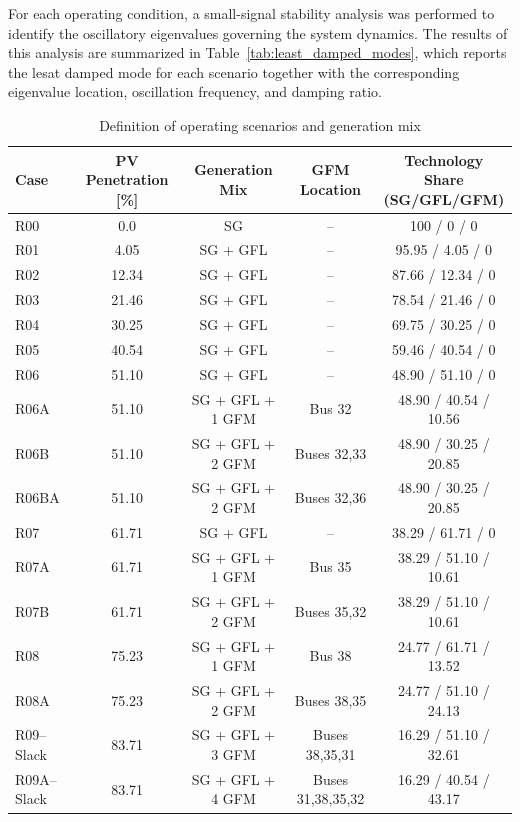 For each operating condition, a small-signal stability analysis was performed to identify the oscillatory eigenvalues governing the system dynamics. The results of this analysis are summarized in Table~\ref{tab:least_damped_modes}, which reports the lesat damped mode for each scenario together with the corresponding eigenvalue location, oscillation frequency, and damping ratio.

\begin{table}[htbp]
\centering
\caption{Definition of operating scenarios and generation mix}
\label{tab:scenario_definition}
\begin{tabular}{lcccc}
\toprule
Case & PV Penetration [\%] & Generation Mix & GFM Location & \makecell{Technology Share \\ (SG/GFL/GFM)}\\
\midrule
R00 & 0.0 & SG & -- & 100 / 0 / 0 \\
R01 & 4.05 & SG + GFL & -- & 95.95 / 4.05 / 0 \\
R02 & 12.34 & SG + GFL & -- & 87.66 / 12.34 / 0 \\
R03 & 21.46 & SG + GFL & -- & 78.54 / 21.46 / 0 \\
R04 & 30.25 & SG + GFL & -- & 69.75 / 30.25 / 0 \\
R05 & 40.54 & SG + GFL & -- & 59.46 / 40.54 / 0 \\
R06 & 51.10 & SG + GFL & -- & 48.90 / 51.10 / 0 \\
R06A & 51.10 & SG + GFL + 1 GFM & Bus 32 & 48.90 / 40.54 / 10.56 \\
R06B & 51.10 & SG + GFL + 2 GFM & Buses 32,33 & 48.90 / 30.25 / 20.85 \\
R06BA & 51.10 & SG + GFL + 2 GFM & Buses 32,36 & 48.90 / 30.25 / 20.85 \\
R07 & 61.71 & SG + GFL & -- & 38.29 / 61.71 / 0 \\
R07A & 61.71 & SG + GFL + 1 GFM & Bus 35 & 38.29 / 51.10 / 10.61 \\
R07B & 61.71 & SG + GFL + 2 GFM & Buses 35,32 & 38.29 / 51.10 / 10.61 \\
R08 & 75.23 & SG + GFL + 1 GFM & Bus 38 & 24.77 / 61.71 / 13.52 \\
R08A & 75.23 & SG + GFL + 2 GFM & Buses 38,35 & 24.77 / 51.10 / 24.13 \\
R09--Slack & 83.71 & SG + GFL + 3 GFM & Buses 38,35,31 & 16.29 / 51.10 / 32.61 \\
R09A--Slack & 83.71 & SG + GFL + 4 GFM & Buses 31,38,35,32 & 16.29 / 40.54 / 43.17 \\
\bottomrule
\end{tabular}
\end{table}

